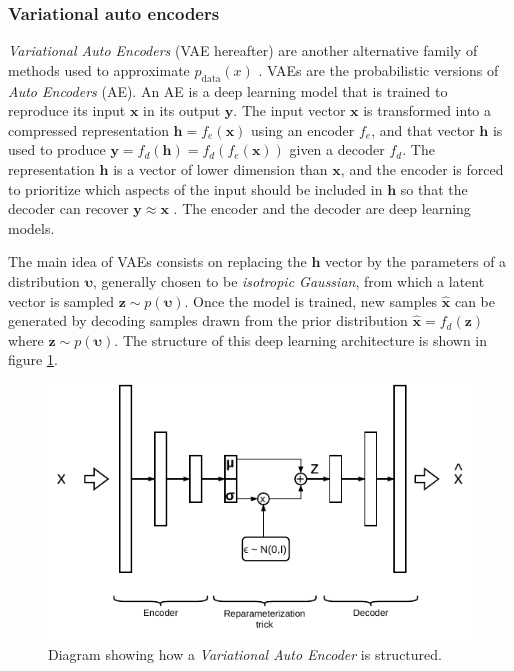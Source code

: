 \subsubsection{Variational auto encoders}
\textit{Variational Auto Encoders} (VAE hereafter) are another alternative family of methods used to approximate $p_\mathrm{data}(x)$ \autocite{kingma2019}. VAEs are the probabilistic versions of \textit{Auto Encoders} (AE). An AE is a deep learning model that is trained to reproduce its input $\mathbf{x}$ in its output $\mathbf{y}$. The input vector $\mathbf{x}$ is transformed into a compressed representation $\mathbf{h}=f_e(\mathbf{x})$ using an encoder $f_e$, and that vector $\mathbf{h}$ is used to produce $\mathbf{y}=f_d(\mathbf{h})=f_d(f_e(\mathbf{x}))$ given a decoder $f_d$. The representation $\mathbf{h}$ is a vector of lower dimension than $\mathbf{x}$, and the encoder is forced to prioritize which aspects of the input should be included in $\mathbf{h}$ so that the decoder can recover $\mathbf{y}\approx \mathbf{x}$ \autocite{Goodfellow2016}. The encoder and the decoder are deep learning models.

The main idea of VAEs consists on replacing the $\mathbf{h}$ vector by the parameters of a distribution $\mathbf{\upsilon}$, generally chosen to be \textit{isotropic Gaussian}, from which a latent vector is sampled $\mathbf{z} \sim p(\mathbf{\upsilon})$. Once the model is trained, new samples $\mathbf{\hat{x}}$ can be generated by decoding samples drawn from the prior distribution $\mathbf{\hat{x}} = f_d(\mathbf{z})$ where $\mathbf{z} \sim p(\mathbf{\upsilon})$. The structure of this deep learning architecture is shown in figure \ref{fig:vae}.

\begin{figure}
	\centering
	\includegraphics[width=0.7\linewidth]{chapter2/images/vae}
	\caption{Diagram showing how a \textit{Variational Auto Encoder} is structured. }
	\label{fig:vae}
\end{figure}



